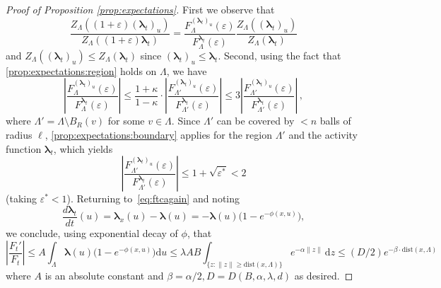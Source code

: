 \documentclass[10pt]{amsart}
\theoremstyle{definition}
\theoremstyle{remark}
\newcommand{\dist}{\mathrm{dist}}
\newcommand{\region}{\Lambda}
\newcommand{\potential}{\phi}
\newcommand{\activities}{\pmb{\lambda}}
\newcommand{\diff}{\mathrm{d}}
\newcommand{\norm}[1]{\left\lVert#1\right\rVert}
\newcommand{\absolute}[1]{\left\lvert#1\right\rvert}
\newcommand{\epsbound}{\varepsilon^{*}}
\begin{document}
\begin{proof}[Proof of Proposition \ref{prop:expectations}]
		First we observe that
		\[
		\frac{Z_\region((1+\varepsilon)(\activities_t)_u)}
		{Z_\region((1+\varepsilon)\activities_t)}
		=
		\frac{F_\region^{(\activities_t)_u}(\varepsilon)}
		{F_\region^{\activities_t}(\varepsilon)}
		\frac{Z_\region((\activities_t)_u)}{Z_\region(\activities_t)}
		\]
		and $Z_\region((\activities_t)_u)\leq Z_\region(\activities_t)$ since $(\activities_t)_u\leq \activities_t$. Second,
		using the fact that \ref{prop:expectations:region} holds on $\region$, we have 
		\[
		\absolute{\frac{F_\region^{(\activities_t)_u}(\varepsilon)}{F_\region^{\activities_t}(\varepsilon)}}
		\le 
		\frac{1 + \kappa}{1 - \kappa} \cdot \absolute{\frac{F_{\region'}^{(\activities_t)_u}(\varepsilon)}
			{F_{\region'}^{\activities_t}(\varepsilon)}} 
		\leq 3\absolute{\frac{F_{\region'}^{(\activities_t)_u}(\varepsilon)}
			{F_{\region'}^{\activities_t}(\varepsilon)}}\, ,
		\]
		where $\region' = \region \setminus B_R(v)$ for some $v \in \region$.
		Since $\region'$ can be covered by $< n$ balls of radius $\ell$, \ref{prop:expectations:boundary} applies for the region $\region'$ and the activity function $\activities_{t}$, which yields
		\[
		\absolute{\frac{F_{\region'}^{(\activities_t)_u}(\varepsilon)}
			{F_{\region'}^{\activities_t}(\varepsilon)}}
		\le 1 + \sqrt{\epsbound}<2 
		\]
		(taking $\epsbound<1$).
		Returning to~\eqref{eq:ftcagain} and noting
		\[
		\frac{d\activities_t}{dt}(u)
		=
		\activities_x(u)-\activities(u)
		=
		-\activities(u)\big(1-e^{-\potential(x,u)}\big),
		\]
		we conclude, using exponential decay of $\potential$, that
		\[
		\absolute{\frac{F_t'}{F_t}}\leq A \int_\region \activities(u)\big(1-e^{-\potential(x,u)}\big) \diff u
		\leq 
		\lambda AB \int_{\{z:\norm{z}\ge \dist(x,\region)\}}e^{-\alpha\norm{z}}\,\diff z \leq (D/2)e^{-\beta\cdot\dist(x,\region)}
		\]
		where $A$ is an absolute constant and $\beta=\alpha/2, D=D(B, \alpha, \lambda,d)$
		as desired.
		
		\medskip 
		

\end{proof}
\end{document}
